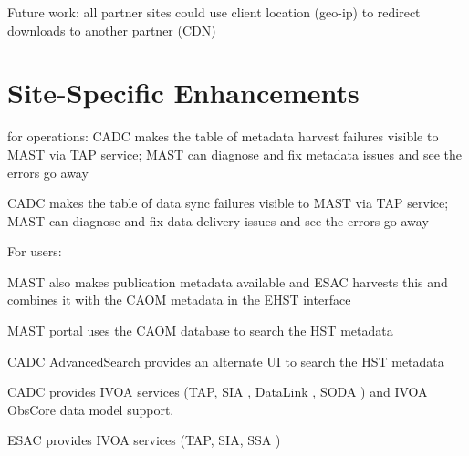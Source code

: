 \documentclass[11pt,twoside]{article}
\begin{document}
Future work: all partner sites could use client location (geo-ip) to redirect downloads to another partner (CDN) 

\section{Site-Specific Enhancements}

for operations: 
CADC makes the table of metadata harvest failures visible to MAST via TAP \citep{std:TAP} service; 
MAST can diagnose and fix metadata issues and see the errors go away

CADC makes the table of data sync failures  visible to MAST via TAP service; MAST can diagnose and fix data delivery issues and see the errors go away

For users:

MAST also makes publication metadata available and ESAC harvests this and combines it with the CAOM metadata in the EHST interface

MAST portal uses the CAOM database to search the HST metadata

CADC AdvancedSearch provides an alternate UI to search the HST metadata

CADC provides IVOA services (TAP, SIA \citep{std:SIA}, DataLink \citep{std:DataLink}, SODA \citep{std:SODA}) and IVOA ObsCore data model support.

ESAC provides IVOA services (TAP, SIA, SSA \citep{std:SSA})


\end{document}
